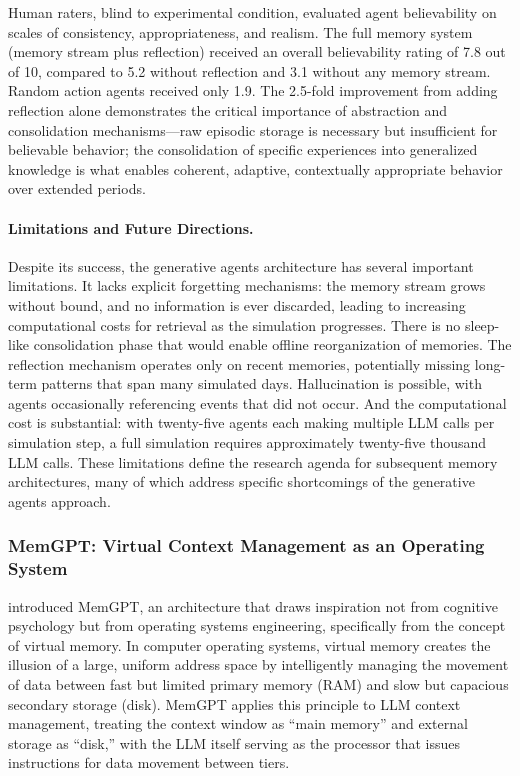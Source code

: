 \documentclass[11pt,letterpaper]{article}
\begin{document}
Human raters, blind to experimental condition, evaluated agent believability on scales of consistency, appropriateness, and realism. The full memory system (memory stream plus reflection) received an overall believability rating of 7.8 out of 10, compared to 5.2 without reflection and 3.1 without any memory stream. Random action agents received only 1.9. The 2.5-fold improvement from adding reflection alone demonstrates the critical importance of abstraction and consolidation mechanisms---raw episodic storage is necessary but insufficient for believable behavior; the consolidation of specific experiences into generalized knowledge is what enables coherent, adaptive, contextually appropriate behavior over extended periods.

\paragraph{Limitations and Future Directions.} Despite its success, the generative agents architecture has several important limitations. It lacks explicit forgetting mechanisms: the memory stream grows without bound, and no information is ever discarded, leading to increasing computational costs for retrieval as the simulation progresses. There is no sleep-like consolidation phase that would enable offline reorganization of memories. The reflection mechanism operates only on recent memories, potentially missing long-term patterns that span many simulated days. Hallucination is possible, with agents occasionally referencing events that did not occur. And the computational cost is substantial: with twenty-five agents each making multiple LLM calls per simulation step, a full simulation requires approximately twenty-five thousand LLM calls. These limitations define the research agenda for subsequent memory architectures, many of which address specific shortcomings of the generative agents approach.

\subsubsection{MemGPT: Virtual Context Management as an Operating System}

\cite{packer2023memgpt} introduced MemGPT, an architecture that draws inspiration not from cognitive psychology but from operating systems engineering, specifically from the concept of virtual memory. In computer operating systems, virtual memory creates the illusion of a large, uniform address space by intelligently managing the movement of data between fast but limited primary memory (RAM) and slow but capacious secondary storage (disk). MemGPT applies this principle to LLM context management, treating the context window as ``main memory'' and external storage as ``disk,'' with the LLM itself serving as the processor that issues instructions for data movement between tiers.
\end{document}
